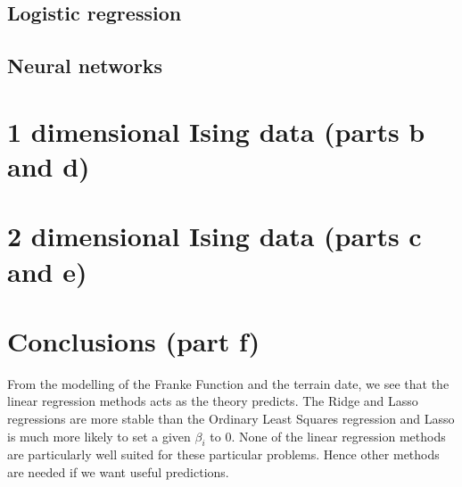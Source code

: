 \documentclass[parskip=half]{scrartcl}
\theoremstyle{definition}
\theoremstyle{remark}
\begin{document}
\subsection{Logistic regression} \label{sec:logistic} 





\subsection{Neural networks} \label{sec:neuralnet} 
 
\section{1 dimensional Ising data (parts b and d)} \label{sec:1dising}

\section{2 dimensional Ising data (parts c and e)} \label{sec:2dising}

\section{Conclusions (part f)} \label{sec:conclusion}

From the modelling of the Franke Function and the terrain date, we see that the linear regression methods acts as the theory predicts.
The Ridge and Lasso regressions are more stable than the Ordinary Least Squares regression and Lasso is much more likely to set a given $\beta_i$ to $0$. 
None of the linear regression methods are particularly well suited for these particular problems. 
Hence other methods are needed if we want useful predictions. 


\end{document}
